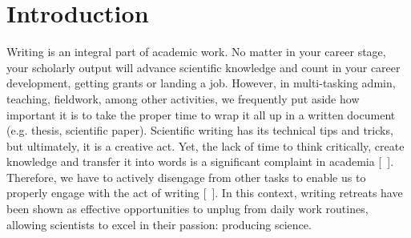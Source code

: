 \documentclass[10pt,letterpaper]{article}
\begin{document}



\linenumbers

\section*{Introduction}

Writing is an integral part of academic work. No matter in your career stage, your scholarly output will advance scientific knowledge and count in your career development, getting grants or landing a job. However, in multi-tasking admin, teaching, fieldwork, among other activities, we frequently put aside how important it is to take the proper time to wrap it all up in a written document (e.g. thesis, scientific paper). Scientific writing has its technical tips and tricks, but ultimately, it is a creative act. Yet, the lack of time to think critically, create knowledge and transfer it into words is a significant complaint in academia [~\cite{menzies}]. Therefore, we have to actively disengage from other tasks to enable us to properly engage with the act of writing [~\cite{murray2013}]. In this context, writing retreats have been shown as effective opportunities to unplug from daily work routines, allowing scientists to excel in their passion: producing science.
\end{document}
